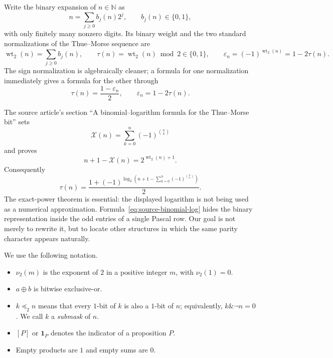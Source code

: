 \documentclass[11pt,oneside]{article}
\theoremstyle{definition}
\theoremstyle{remark}
\newcommand{\N}{\mathbb N}
\newcommand{\wt}{\operatorname{wt}_2}
\newcommand{\vtwo}{\nu_2}
\newcommand{\ind}{\mathbf 1}
\newcommand{\xor}{\mathbin{\oplus}}
\newcommand{\preceqbits}{\mathrel{\preccurlyeq_2}}
\newcommand{\bitand}{\mathbin{\&}}
\begin{document}
Write the binary expansion of $n\in\N$ as
\begin{equation}
  n=\sum_{j\ge0} b_j(n)2^j,
  \qquad b_j(n)\in\{0,1\},                                  \label{eq:binary-expansion}
\end{equation}
with only finitely many nonzero digits.  Its binary weight and the two standard
normalizations of the Thue--Morse sequence are
\begin{equation}
  \wt(n)=\sum_{j\ge0}b_j(n),
  \qquad
  \tau(n)=\wt(n)\bmod2\in\{0,1\},
  \qquad
  \varepsilon_n=(-1)^{\wt(n)}=1-2\tau(n).                  \label{eq:basic-definitions}
\end{equation}
The sign normalization is algebraically cleaner; a formula for one normalization
immediately gives a formula for the other through
\begin{equation}
  \tau(n)=\frac{1-\varepsilon_n}{2},
  \qquad
  \varepsilon_n=1-2\tau(n).                                \label{eq:normalization-bridge}
\end{equation}

The source article's section ``A binomial--logarithm formula for the
Thue--Morse bit'' sets
\begin{equation}
  \mathcal X(n)=\sum_{k=0}^{n}(-1)^{\binom nk}              \label{eq:source-X}
\end{equation}
and proves
\begin{equation}
  n+1-\mathcal X(n)=2^{\wt(n)+1}.                           \label{eq:source-exact-power}
\end{equation}
Consequently
\begin{equation}
  \tau(n)=
  \frac{1+(-1)^{\log_2\!\left(n+1-
       \sum_{k=0}^{n}(-1)^{\binom nk}\right)}}{2}.          \label{eq:source-binomial-log}
\end{equation}
The exact-power theorem is essential: the displayed logarithm is not being used
as a numerical approximation.  Formula~\eqref{eq:source-binomial-log} hides the
binary representation inside the odd entries of a single Pascal row.  Our goal
is not merely to rewrite it, but to locate other structures in which the same
parity character appears naturally.

We use the following notation.
\begin{itemize}
\item $\vtwo(m)$ is the exponent of $2$ in a positive integer $m$, with
      $\vtwo(1)=0$.
\item $a\xor b$ is bitwise exclusive-or.
\item $k\preceqbits n$ means that every $1$-bit of $k$ is also a $1$-bit of $n$;
      equivalently, $k\bitand\neg n=0$.  We call $k$ a \emph{submask} of $n$.
\item $[P]$ or $\ind_P$ denotes the indicator of a proposition $P$.
\item Empty products are $1$ and empty sums are $0$.
\end{itemize}
\end{document}
